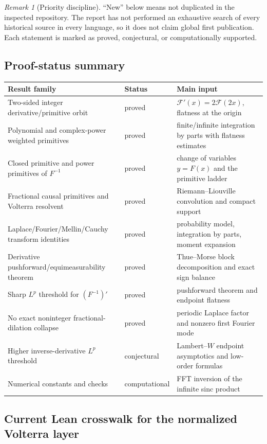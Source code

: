 \documentclass[11pt]{article}
\theoremstyle{definition}
\theoremstyle{remark}
\newtheorem{remark}[theorem]{Remark}
\newcommand{\FF}{\mathscr F}
\begin{document}
\begin{remark}[Priority discipline]
``New'' below means not duplicated in the inspected repository.  The report has not
performed an exhaustive search of every historical source in every language, so it does
not claim global first publication.  Each statement is marked as proved, conjectural,
or computationally supported.
\end{remark}

\subsection{Proof-status summary}

\begin{longtable}{p{}p{}p{}}
\toprule
Result family & Status & Main input \\
\midrule
\endhead
Two-sided integer derivative/primitive orbit & proved &
\(\FF'(x)=2\FF(2x)\), flatness at the origin \\
Polynomial and complex-power weighted primitives & proved &
finite/infinite integration by parts with flatness estimates \\
Closed primitive and power primitives of \(F^{-1}\) & proved &
change of variables \(y=F(x)\) and the primitive ladder \\
Fractional causal primitives and Volterra resolvent & proved &
Riemann--Liouville convolution and compact support \\
Laplace/Fourier/Mellin/Cauchy transform identities & proved &
probability model, integration by parts, moment expansion \\
Derivative pushforward/equimeasurability theorem & proved &
Thue--Morse block decomposition and exact sign balance \\
Sharp \(L^p\) threshold for \((F^{-1})'\) & proved &
pushforward theorem and endpoint flatness \\
No exact noninteger fractional-dilation collapse & proved &
periodic Laplace factor and nonzero first Fourier mode \\
Higher inverse-derivative \(L^p\) threshold & conjectural &
Lambert--\(W\) endpoint asymptotics and low-order formulas \\
Numerical constants and checks & computational &
FFT inversion of the infinite sinc product \\
\bottomrule
\end{longtable}

\subsection{Current Lean crosswalk for the normalized Volterra layer}
\end{document}
